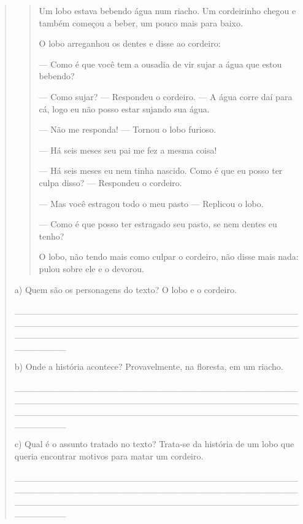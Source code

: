 \begin{boxlist}
\begin{quote}
\begin{iteize}
{\begin{quote}
Um lobo estava bebendo água num riacho. Um cordeirinho chegou e também
começou a beber, um pouco mais para baixo.

O lobo arreganhou os dentes e disse ao cordeiro:

--- Como é que você tem a ousadia de vir sujar a água que estou bebendo?

--- Como sujar? --- Respondeu o cordeiro. --- A água corre daí para cá,
logo eu não posso estar sujando sua água.

--- Não me responda! --- Tornou o lobo furioso.

--- Há seis meses seu pai me fez a mesma coisa!

--- Há seis meses eu nem tinha nascido. Como é que eu posso ter culpa
disso? --- Respondeu o cordeiro.

--- Mas você estragou todo o meu pasto --- Replicou o lobo.

--- Como é que posso ter estragado seu pasto, se nem dentes eu tenho?

O lobo, não tendo mais como culpar o cordeiro, não disse mais nada:
pulou sobre ele e o devorou.

\end{quote}

a) Quem são os personagens do texto? O lobo e o cordeiro.

\_\_\_\_\_\_\_\_\_\_\_\_\_\_\_\_\_\_\_\_\_\_\_\_\_\_\_\_\_\_\_\_\_\_\_\_\_\_\_\_\_\_\_\_\_\_\_\_\_\_\_\_\_\_\_\_\_\_\_\_\_\_\_\_\_\_\_\_\_\_\_\_\_\_\_\_\_\_\_\_\_\_\_\_\_\_\_\_\_\_\_\_\_\_\_\_\_\_\_\_\_\_\_\_\_\_\_\_\_\_\_\_\_\_\_\_\_\_\_\_\_\_\_\_\_\_\_\_\_\_\_\_\_\_\_\_\_\_\_\_

b) Onde a história acontece? Provavelmente, na floresta, em um riacho.

\_\_\_\_\_\_\_\_\_\_\_\_\_\_\_\_\_\_\_\_\_\_\_\_\_\_\_\_\_\_\_\_\_\_\_\_\_\_\_\_\_\_\_\_\_\_\_\_\_\_\_\_\_\_\_\_\_\_\_\_\_\_\_\_\_\_\_\_\_\_\_\_\_\_\_\_\_\_\_\_\_\_\_\_\_\_\_\_\_\_\_\_\_\_\_\_\_\_\_\_\_\_\_\_\_\_\_\_\_\_\_\_\_\_\_\_\_\_\_\_\_\_\_\_\_\_\_\_\_\_\_\_\_\_\_\_\_\_\_\_

c) Qual é o assunto tratado no texto? Trata-se da história de um lobo
que queria encontrar motivos para matar um cordeiro.

\_\_\_\_\_\_\_\_\_\_\_\_\_\_\_\_\_\_\_\_\_\_\_\_\_\_\_\_\_\_\_\_\_\_\_\_\_\_\_\_\_\_\_\_\_\_\_\_\_\_\_\_\_\_\_\_\_\_\_\_\_\_\_\_\_\_\_\_\_\_\_\_\_\_\_\_\_\_\_\_\_\_\_\_\_\_\_\_\_\_\_\_\_\_\_\_\_\_\_\_\_\_\_\_\_\_\_\_\_\_\_\_\_\_\_\_\_\_\_\_\_\_\_\_\_\_\_\_\_\_\_\_\_\_\_\_\_\_\_\_

}
\end{iteize}
\end{quote}
\end{boxlist}
